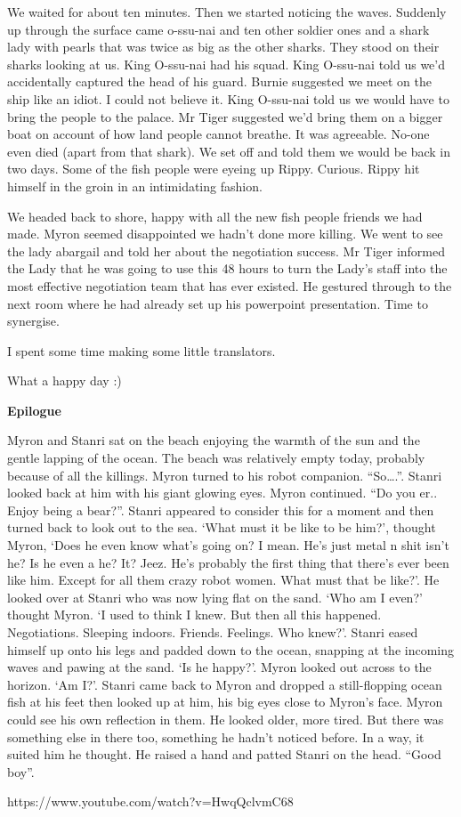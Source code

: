 We waited for about ten minutes. Then we started noticing the waves. Suddenly up through the surface came o-ssu-nai and ten other soldier ones and a shark lady with pearls that was twice as big as the other sharks. They stood on their sharks looking at us. King O-ssu-nai had his squad. King O-ssu-nai told us we’d accidentally captured the head of his guard. Burnie suggested we meet on the ship like an idiot. I could not believe it. King O-ssu-nai told us we would have to bring the people to the palace. Mr Tiger suggested we’d bring them on a bigger boat on account of how land people cannot breathe. It was agreeable. No-one even died (apart from that shark). We set off and told them we would be back in two days. Some of the fish people were eyeing up Rippy. Curious. Rippy hit himself in the groin in an intimidating fashion.\medskip

We headed back to shore, happy with all the new fish people friends we had made. Myron seemed disappointed we hadn’t done more killing. We went to see the lady abargail and told her about the negotiation success. Mr Tiger informed the Lady that he was going to use this 48 hours to turn the Lady’s staff into the most effective negotiation team that has ever existed. He gestured through to the next room where he had already set up his powerpoint presentation. Time to synergise.\medskip

I spent some time making some little translators.\medskip

What a happy day :)\medskip

\textbf{Epilogue}\medskip

Myron and Stanri sat on the beach enjoying the warmth of the sun and the gentle lapping of the ocean. The beach was relatively empty today, probably because of all the killings. Myron turned to his robot companion. “So….”. Stanri looked back at him with his giant glowing eyes. Myron continued. “Do you er.. Enjoy being a bear?”. Stanri appeared to consider this for a moment and then turned back to look out to the sea. ‘What must it be like to be him?’, thought Myron, ‘Does he even know what’s going on? I mean. He’s just metal n shit isn’t he? Is he even a he? It? Jeez. He’s probably the first thing that there’s ever been like him. Except for all them crazy robot women. What must that be like?’. He looked over at Stanri who was now lying flat on the sand. ‘Who am I even?’ thought Myron. ‘I used to think I knew. But then all this happened. Negotiations. Sleeping indoors. Friends. Feelings. Who knew?’. Stanri eased himself up onto his legs and padded down to the ocean, snapping at the incoming waves and pawing at the sand. ‘Is he happy?’. Myron looked out across to the horizon. ‘Am I?’. Stanri came back to Myron and dropped a still-flopping ocean fish at his feet then looked up at him, his big eyes close to Myron’s face. Myron could see his own reflection in them. He looked older, more tired. But there was something else in there too, something he hadn’t noticed before. In a way, it suited him he thought. He raised a hand and patted Stanri on the head. “Good boy”.\medskip

https://www.youtube.com/watch?v=HwqQclvmC68

\vspace*{5mm}

